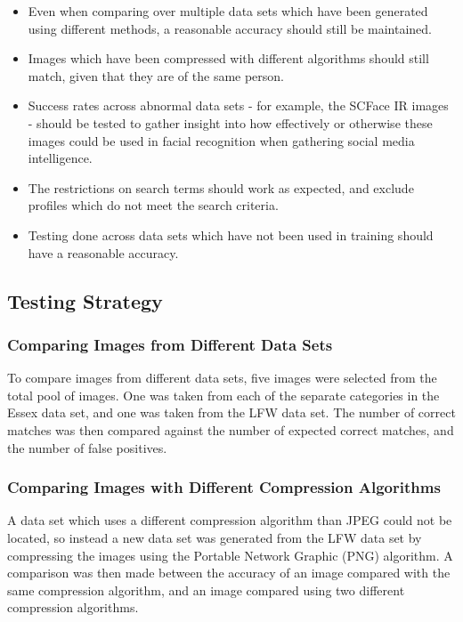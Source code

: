 \documentclass[12pt]{article}
\begin{document}
\begin{itemize}

\item{Even when comparing over multiple data sets which have been generated using different methods, a reasonable accuracy should still be maintained.}
\item{Images which have been compressed with different algorithms should still match, given that they are of the same person.}
\item{Success rates across abnormal data sets - for example, the SCFace IR images - should be tested to gather insight into how effectively or otherwise these images could be used in facial recognition when gathering social media intelligence.}
\item{The restrictions on search terms should work as expected, and exclude profiles which do not meet the search criteria.}
\item{Testing done across data sets which have not been used in training should have a reasonable accuracy.}
\end{itemize}

\subsection{Testing Strategy}
\subsubsection{Comparing Images from Different Data Sets}
To compare images from different data sets, five images were selected from the total pool of images. One was taken from each of the separate categories in the Essex data set, and one was taken from the LFW data set. The number of correct matches was then compared against the number of expected correct matches, and the number of false positives.

\subsubsection{Comparing Images with Different Compression Algorithms}
A data set which uses a different compression algorithm than JPEG could not be located, so instead a new data set was generated from the LFW data set by compressing the images using the Portable Network Graphic (PNG) algorithm. A comparison was then made between the accuracy of an image compared with the same compression algorithm, and an image compared using two different compression algorithms.
\end{document}
